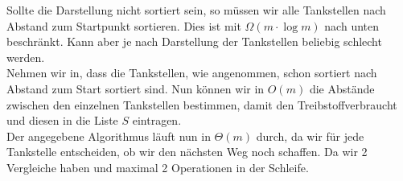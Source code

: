 \documentclass[11pt,a4paper,ngerman]{article}
\begin{document}
Sollte die Darstellung nicht sortiert sein, so müssen wir alle Tankstellen nach Abstand zum Startpunkt sortieren. Dies ist mit $\Omega (m \cdot \log m)$ nach unten beschränkt. Kann aber je nach Darstellung der Tankstellen beliebig schlecht werden.\\

Nehmen wir in, dass die Tankstellen, wie angenommen, schon sortiert nach Abstand zum Start sortiert sind. Nun können wir in $O(m)$ die Abstände zwischen den einzelnen Tankstellen bestimmen, damit den Treibstoffverbraucht und diesen in die Liste $S$ eintragen.\\

Der angegebene Algorithmus läuft nun in $\Theta (m)$ durch, da wir für jede Tankstelle entscheiden, ob wir den nächsten Weg noch schaffen. Da wir 2 Vergleiche haben und maximal 2 Operationen in der Schleife.

\label{LastPage}
\end{document}
